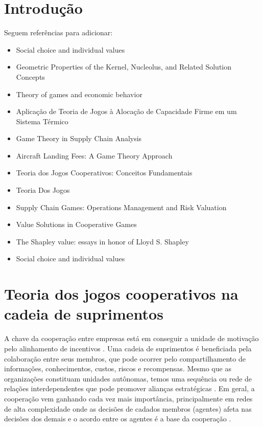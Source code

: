 \documentclass[
	article,			        %
	11pt,				          %
	oneside,			        %
	a4paper,			        %
	english,			        %
	brazil,				        %
	sumario=tradicional
]{abntex2}\usepackage[]{graphicx}\usepackage[]{color}
\begin{document}
\section*{Introdução}

Seguem referências para adicionar:\\

\begin{itemize}
  \item Social choice and individual values\cite{Figueiredo.1994}
  \item Geometric Properties of the Kernel, Nucleolus, and Related Solution Concepts\cite{Maschler.1979}
  \item Theory of games and economic behavior\cite{Neumann.1947}
  \item Aplicação de Teoria de Jogos à Alocação de Capacidade Firme em um Sistema Térmico\cite{Ayala.2008}
  \item Game Theory in Supply Chain Analysis\cite{Cachon.2004}
  \item Aircraft Landing Fees: A Game Theory Approach\cite{Littlechild.1977}
  \item Teoria dos Jogos Cooperativos: Conceitos Fundamentais\cite{Moreira.2002}
  \item Teoria Dos Jogos\cite{Fiani.2006}
  \item Supply Chain Games: Operations Management and Risk Valuation\cite{kogan.2007}
  \item Value Solutions in Cooperative Games\cite{Mccain.2013} 
  \item The Shapley value: essays in honor of Lloyd S. Shapley\cite{Alvin.1988}
  \item Social choice and individual values\cite{Arrow.2012}
\end{itemize}


\section{Teoria dos jogos cooperativos na cadeia de suprimentos}

A chave da cooperação entre empresas está em conseguir a unidade de motivação pelo alinhamento de incentivos \cite{Cao.2012}. Uma cadeia de suprimentos é beneficiada pela colaboração entre seus membros, que pode ocorrer pelo compartilhamento de informações, conhecimentos, custos, riscos e recompensas. Mesmo que as organizações constituam unidades autônomas, temos uma sequência ou rede de relações interdependentes que pode promover alianças estratégicas \cite{Chen.2004}. Em geral, a cooperação vem ganhando cada vez mais importância, principalmente em redes de alta complexidade \cite{Drechsel.2010} onde as decisões de cadados membros (agentes) afeta nas decisões dos demais e o acordo entre os agentes é a base da cooperação \cite{Young.1994}.
\end{document}
